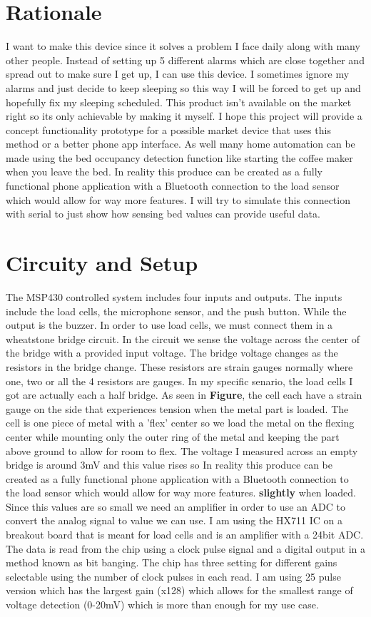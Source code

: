 \documentclass[11pt]{article}
\begin{document}
\section{Rationale}
I want to make this device since it solves a problem I face daily along with many other people.
Instead of setting up 5 different alarms which are close together and spread out to make sure I get up, I can use this device.
I sometimes ignore my alarms and just decide to keep sleeping so this way I will be forced to get up and hopefully fix my sleeping scheduled.
This product isn't available on the market right so its only achievable by making it myself.
I hope this project will provide a concept functionality prototype for a possible market device that uses this method or a better phone app interface. 
As well many home automation can be made using the bed occupancy detection function like starting the coffee maker when you leave the bed.
In reality this produce can be created as a fully functional phone application with a Bluetooth connection to the load sensor which would allow for way more features.
I will try to simulate this connection with serial to just show how sensing bed values can provide useful data. 

\section{Circuity and Setup}
The MSP430 controlled system includes four inputs and outputs.
The inputs include the load cells, the microphone sensor, and the push button.
While the output is the buzzer. 
In order to use load cells, we must connect them in a wheatstone bridge circuit. 
In the circuit we sense the voltage across the center of the bridge with a provided input voltage. 
The bridge voltage changes as the resistors in the bridge change. 
These resistors are strain gauges normally where one, two or all the 4 resistors are gauges.
In my specific senario, the load cells I got are actually each a half bridge. 
As seen in \textbf{Figure}, the cell each have a strain gauge on the side that experiences tension when the metal part is loaded. 
The cell is one piece of metal with a 'flex' center so we load the metal on the flexing center while mounting only the outer ring of the metal and keeping the part above ground to allow for room to flex.
The voltage I measured across an empty bridge is around 3mV and this value rises so In reality this produce can be created as a fully functional phone application with a Bluetooth connection to the load sensor which would allow for way more features. \textbf{slightly} when loaded. 
Since this values are so small we need an amplifier in order to use an ADC to convert the analog signal to value we can use. 
I am using the HX711 IC on a breakout board that is meant for load cells and is an amplifier with a 24bit ADC. 
The data is read from the chip using a clock pulse signal and a digital output in a method known as bit banging.  
The chip has three setting for different gains selectable using the number of clock pulses in each read. 
I am using 25 pulse version which has the largest gain (x128) which allows for the smallest range of voltage detection (0-20mV) which is more than enough for my use case.
 
\end{document}
